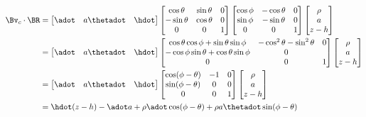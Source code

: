 \begin{align*}
\Bv_c \cdot \BR 
&=
\begin{bmatrix}
\adot & a \thetadot  & \hdot 
\end{bmatrix}
\begin{bmatrix}
\cos\theta & \sin\theta & 0 \\
-\sin\theta & \cos\theta & 0 \\
0 & 0 & 1
\end{bmatrix}
\begin{bmatrix}
\cos\phi & - \cos\theta & 0 \\
\sin\phi & - \sin\theta & 0 \\
0 & 0 & 1 
\end{bmatrix}
\begin{bmatrix}
\rho \\
a \\
z - h
\end{bmatrix} \\
&=
\begin{bmatrix}
\adot & a \thetadot  & \hdot 
\end{bmatrix}
\begin{bmatrix}
\cos\theta \cos\phi + \sin\theta \sin\phi & -\cos^2 \theta - \sin^2 \theta & 0 \\
-\cos\phi \sin\theta + \cos\theta \sin\phi & 0 \\
0 & 0 & 1
\end{bmatrix}
\begin{bmatrix}
\rho \\
a \\
z - h
\end{bmatrix} \\
&=
\begin{bmatrix}
\adot & a \thetadot  & \hdot 
\end{bmatrix}
\begin{bmatrix}
\cos(\phi - \theta) & -1 & 0 \\
\sin(\phi - \theta) & 0 & 0 \\
0 & 0 & 1
\end{bmatrix}
\begin{bmatrix}
\rho \\
a \\
z - h
\end{bmatrix} \\
&=
\hdot(z - h) - \adot a + \rho \adot \cos(\phi - \theta) + \rho a \thetadot \sin(\phi - \theta)
\end{align*}

\EndArticle
